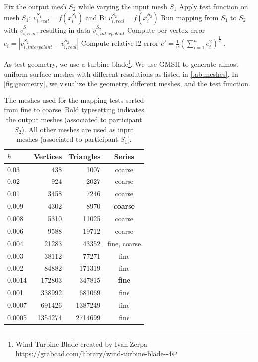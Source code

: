 \begin{algorithm}[H]
  \caption{Data mapping error procedure}
  \label{alg:mapError}
  \begin{algorithmic}[1]
    \State Fix the output mesh $S_2$ while varying the input mesh $S_1$
    \State Apply test function on mesh $S_1$: $v^{S_1}_{i,real} = f(x^{S_1}_i)$ and B: $v^{S_2}_{i,real} = f(x^{S_2}_i)$
    \State Run mapping from $S_1$ to $S_2$ with $v^{S_1}_{i,real}$, resulting in data $v^{S_2}_{i,interpolant}$
    \State Compute per vertex error  $e_i = | v^{S_2}_{i,interpolant} - v^{S_2}_{i,real} |$
    \State Compute relative-l2 error $e' = \frac{1}{n} \left(\sum_{i=1}^n e_{i}^2 \right)^{\frac{1}{2}}\;.$
  \end{algorithmic}
\end{algorithm}

As test geometry, we use a turbine blade\footnote{Wind Turbine Blade created by Ivan Zerpa \url{https://grabcad.com/library/wind-turbine-blade--4}}. We use GMSH\cite{geuzaine2009gmsh} to generate almost uniform surface meshes with different resolutions as listed in \autoref{tab:meshes}. In \autoref{fig:geometry}, we visualize the geometry, different meshes, and the test function. 

\begin{table}[h!]
  \centering
  \caption{The meshes used for the mapping tests sorted from fine to coarse. Bold typesetting indicates the output meshes (associated to participant $S_2$). All other meshes are used as input meshes (associated to participant $S_1$).}
  \label{tab:meshes}
  \begin{tabular}{lrrc}
    \toprule
    $h$    & Vertices & Triangles & Series          \\
    \midrule
    0.03   & 438      & 1007      & coarse          \\
    0.02   & 924      & 2027      & coarse          \\
    0.01   & 3458     & 7246      & coarse          \\
    0.009  & 4302     & 8970      & \textbf{coarse} \\
    0.008  & 5310     & 11025     & coarse          \\
    0.006  & 9588     & 19712     & coarse          \\
    0.004  & 21283    & 43352     & fine, coarse    \\
    0.003  & 38112    & 77271     & fine            \\
    0.002  & 84882    & 171319    & fine            \\
    0.0014 & 172803   & 347815    & \textbf{fine}   \\
    0.001  & 338992   & 681069    & fine            \\
    0.0007 & 691426   & 1387249   & fine            \\
    0.0005 & 1354274  & 2714699   & fine            \\
    \bottomrule
  \end{tabular}
\end{table}

